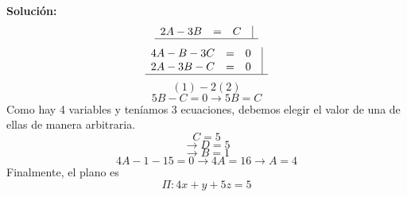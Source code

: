 \documentclass[12pt]{article}
\newenvironment{solucion}
{\begin{mdframed}[backgroundcolor=black!10]
		{\bf Solución:}\\
	}
	{
	\end{mdframed}
}
\newenvironment{preguntas}
{\begin{enumerate}\itemsep12pt
	}
	{
	\end{enumerate}
}
\newcommand{\ra}{\rightarrow}
\begin{document}
\begin{preguntas}
\begin{solucion}
$$\begin{array}{rcrr}
		2A-3B & = & C &\vline\\
		\hline
		\end{array}
		$$
		$$
		\begin{array}{rcrr}
		4A-B-3C & = & 0& \vline\\
		2A-3B -C& = & 0 &\vline\\
		\hline
		\end{array}
		$$
		$$(1) - 2(2)$$
		$$5B - C = 0 \ra 5B = C$$
		Como hay 4 variables y teníamos 3 ecuaciones, debemos elegir el valor de una de ellas de manera arbitraria.
		$$C = 5$$
		$$\ra D = 5$$
		$$\ra B = 1$$
		$$4A -1 -15 = 0 \ra 4A=16 \ra A=4$$
		Finalmente, el plano es
		$$\Pi:4x + y + 5z = 5$$
\end{solucion}
\end{preguntas}
\end{document}

